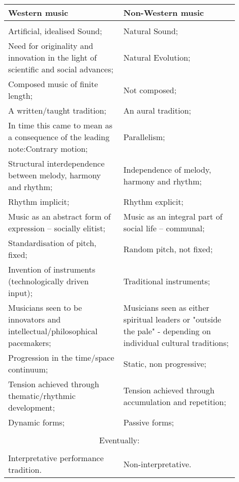 \documentclass{article}
\begin{document}
\begin{tabular}{p{0.45\linewidth}|p{0.45\linewidth}}
    \textbf{Western music} & \textbf{Non-Western music}\\
    \hline\\
    Artificial, idealised Sound; & Natural Sound;\\
    Need for originality and innovation in the light of scientific and social advances; & Natural Evolution;\\
    Composed music of finite length; & Not composed;\\
    A written/taught tradition; & An aural tradition;\\
    In time this came to mean as a consequence of the leading note:\footnotemark Contrary motion; & Parallelism;\\
    Structural interdependence between melody, harmony and rhythm; & Independence of melody, harmony and rhythm;\\
    Rhythm implicit; & Rhythm explicit;\\
    Music as an abstract form of expression -- socially elitist; & Music as an integral part of social life -- communal;\\
    Standardisation of pitch, fixed; & Random pitch, not fixed;\\
    Invention of instruments (technologically driven input); & Traditional instruments;\\
    Musicians seen to be innovators and intellectual/philosophical pacemakers; & Musicians seen as either spiritual leaders or "outside the pale" - depending on individual cultural traditions;\\
    Progression in the time/space continuum; & Static, non progressive;\\
    Tension achieved through thematic/rhythmic development; & Tension achieved through accumulation and repetition;\\
    Dynamic forms; & Passive forms;\\\\

    \multicolumn{2}{c}{Eventually:}\\\\

    Interpretative performance tradition. & Non-interpretative.\\
\end{tabular}\\

\end{document}
